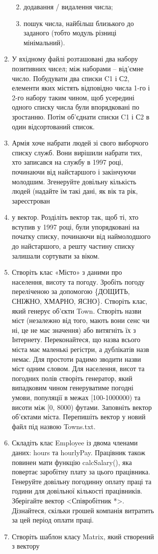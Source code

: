 \documentclass[]{article}
\makeatletter
\newcommand{\xslalph}[1]{\expandafter\@xslalph\csname c@#1\endcsname}
\newcommand{\@xslalph}[1]{%
    \ifcase#1\or а\or б\or в\or г\or д\or e\or є\or ж\or з\or i%
    \or й\or к\or л\or м\or н\or о\or п\or р\or с\or т%
    \or у\or ф\or х\or ц\or ч\or ш\or ю\or я\or аа\or бб\or вв%
    \else\@ctrerr\fi%
}
\makeatother
\begin{document}
\begin{enumerate}
\begin{enumerate}[label=\xslalph*)]
\begin{enumerate}
\begin{enumerate}[label=\xslalph*)]
\begin{enumerate}
\begin{enumerate}[label=\xslalph*)]
\begin{enumerate}
\begin{enumerate}[label=\xslalph*)]
\begin{enumerate}
  \begin{enumerate}
  \def\labelenumii{\alph{enumii}.}
  \item
    додавання / видалення числа;
  \item
    пошук числа, найбільш близького до заданого (тобто модуль різниці
    мінімальний).
  \end{enumerate}
\item
  У вхідному файлі розташовані два набору позитивних чисел; між наборами
  -- від'ємне число. Побудувати два списки C1 і С2, елементи яких
  містять відповідно числа 1-го і 2-го набору таким чином, щоб усередині
  одного списку числа були впорядковані по зростанню. Потім об'єднати
  списки C1 і С2 в один відсортований список.
\item
  Армія хоче набрати людей зі свого виборчого списку служб. Вони
  вирішили набрати тих, хто записався на службу в 1997 році, починаючи
  від найстаршого і закінчуючи молодшим. Згенеруйте довільну кількість
  людей (надайте їм такі дані, як вік та рік, зареєстрован\item у вектор.
  Розділіть вектор так, щоб ті, хто вступив у 1997 році, були
  упорядковані на початку списку, починаючи від наймолодшого до
  найстаршого, а решту частину списку залишали сортувати за віком.
\item
  Створіть клас «Місто» з даними про населення, висоту та погоду.
  Зробіть погоду переліченою за допомогою \{ДОЩИТЬ, СНІЖНО, ХМАРНО,
  ЯСНО\}. Створіть клас, який генерує об'єкти Town. Створіть назви міст
  (незалежно від того, мають вони сенс чи ні, це не має значення) або
  витягніть їх з Інтернету. Переконайтеся, що назва всього міста має
  маленькі регістри, а дублікатів назв немає. Для простоти радимо
  зводити назви міст одним словом. Для населення, висот та погодних
  полів створіть генератор, який випадковим чином генеруватиме погодні
  умови, популяції в межах {[}100-1000000) та висоти між {[}0, 8000)
  футами. Заповніть вектор об'єктами міста. Перепишіть вектор у новий
  файл під назвою Towns.txt.
\item
  Складіть клас Employee із двома членами даних: hours та hourlyPay.
  Працівник також повинен мати функцію calcSalary(), яка повертає
  заробітну плату за цього працівника. Генеруйте довільну погодинну
  оплату праці та години для довільної кількості працівників. Зберігайте
  вектор \textless{}Співробітник *\textgreater{}. Дізнайтеся, скільки
  грошей компанія витратить за цей період оплати праці.
\item
  Створіть шаблон класу Matrix, який створений з вектору

\end{enumerate}
\end{enumerate}
\end{enumerate}
\end{enumerate}
\end{enumerate}
\end{enumerate}
\end{enumerate}
\end{enumerate}
\end{enumerate}
\end{document}
